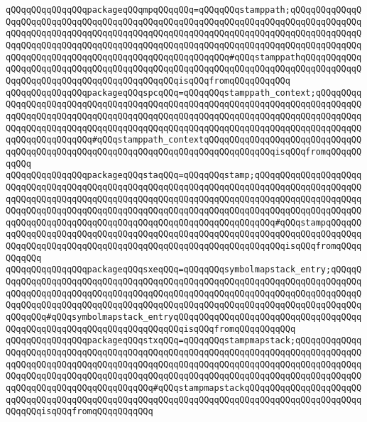 \verb|qQQqqQQqqQQqqQQqpackageqQQqmpqQQqqQQq=qQQqqQQqstamppath;qQQqqQQqqQQqqQQqqQQqqQQqqQQqqQQqqQQqqQQqqQQqqQQqqQQqqQQqqQQqqQQqqQQqqQQqqQQqqQQqqQQqqQQqqQQqqQQqqQQqqQQqqQQqqQQqqQQqqQQqqQQqqQQqqQQqqQQqqQQqqQQqqQQqqQQqqQQqqQQqqQQqqQQqqQQqqQQqqQQqqQQqqQQqqQQqqQQqqQQqqQQqqQQqqQQqqQQqqQQqqQQqqQQqqQQqqQQqqQQqqQQqqQQqqQQqqQQqqQQqqQQqqQQq#qQQqstamppathqQQqqQQqqQQqqQQqqQQqqQQqqQQqqQQqqQQqqQQqqQQqqQQqqQQqqQQqqQQqqQQqqQQqqQQqqQQqqQQqqQQqqQQqqQQqqQQqqQQqqQQqqQQqqQQqqQQqisqQQqfromqQQqqQQqqQQq|\newline
\verb|qQQqqQQqqQQqqQQqpackageqQQqspcqQQq=qQQqqQQqstamppath_context;qQQqqQQqqQQqqQQqqQQqqQQqqQQqqQQqqQQqqQQqqQQqqQQqqQQqqQQqqQQqqQQqqQQqqQQqqQQqqQQqqQQqqQQqqQQqqQQqqQQqqQQqqQQqqQQqqQQqqQQqqQQqqQQqqQQqqQQqqQQqqQQqqQQqqQQqqQQqqQQqqQQqqQQqqQQqqQQqqQQqqQQqqQQqqQQqqQQqqQQqqQQqqQQqqQQqqQQqqQQqqQQqqQQqqQQqqQQq#qQQqstamppath_contextqQQqqQQqqQQqqQQqqQQqqQQqqQQqqQQqqQQqqQQqqQQqqQQqqQQqqQQqqQQqqQQqqQQqqQQqqQQqqQQqqQQqisqQQqfromqQQqqQQqqQQq|\newline
\verb|qQQqqQQqqQQqqQQqpackageqQQqstaqQQq=qQQqqQQqstamp;qQQqqQQqqQQqqQQqqQQqqQQqqQQqqQQqqQQqqQQqqQQqqQQqqQQqqQQqqQQqqQQqqQQqqQQqqQQqqQQqqQQqqQQqqQQqqQQqqQQqqQQqqQQqqQQqqQQqqQQqqQQqqQQqqQQqqQQqqQQqqQQqqQQqqQQqqQQqqQQqqQQqqQQqqQQqqQQqqQQqqQQqqQQqqQQqqQQqqQQqqQQqqQQqqQQqqQQqqQQqqQQqqQQqqQQqqQQqqQQqqQQqqQQqqQQqqQQqqQQqqQQqqQQqqQQqqQQqqQQqqQQq#qQQqstampqQQqqQQqqQQqqQQqqQQqqQQqqQQqqQQqqQQqqQQqqQQqqQQqqQQqqQQqqQQqqQQqqQQqqQQqqQQqqQQqqQQqqQQqqQQqqQQqqQQqqQQqqQQqqQQqqQQqqQQqqQQqqQQqqQQqisqQQqfromqQQqqQQqqQQq|\newline
\verb|qQQqqQQqqQQqqQQqpackageqQQqsxeqQQq=qQQqqQQqsymbolmapstack_entry;qQQqqQQqqQQqqQQqqQQqqQQqqQQqqQQqqQQqqQQqqQQqqQQqqQQqqQQqqQQqqQQqqQQqqQQqqQQqqQQqqQQqqQQqqQQqqQQqqQQqqQQqqQQqqQQqqQQqqQQqqQQqqQQqqQQqqQQqqQQqqQQqqQQqqQQqqQQqqQQqqQQqqQQqqQQqqQQqqQQqqQQqqQQqqQQqqQQqqQQqqQQqqQQqqQQqqQQqqQQqqQQq#qQQqsymbolmapstack_entryqQQqqQQqqQQqqQQqqQQqqQQqqQQqqQQqqQQqqQQqqQQqqQQqqQQqqQQqqQQqqQQqqQQqqQQqisqQQqfromqQQqqQQqqQQq|\newline
\verb|qQQqqQQqqQQqqQQqpackageqQQqstxqQQq=qQQqqQQqstampmapstack;qQQqqQQqqQQqqQQqqQQqqQQqqQQqqQQqqQQqqQQqqQQqqQQqqQQqqQQqqQQqqQQqqQQqqQQqqQQqqQQqqQQqqQQqqQQqqQQqqQQqqQQqqQQqqQQqqQQqqQQqqQQqqQQqqQQqqQQqqQQqqQQqqQQqqQQqqQQqqQQqqQQqqQQqqQQqqQQqqQQqqQQqqQQqqQQqqQQqqQQqqQQqqQQqqQQqqQQqqQQqqQQqqQQqqQQqqQQqqQQqqQQqqQQqqQQq#qQQqstampmapstackqQQqqQQqqQQqqQQqqQQqqQQqqQQqqQQqqQQqqQQqqQQqqQQqqQQqqQQqqQQqqQQqqQQqqQQqqQQqqQQqqQQqqQQqqQQqqQQqqQQqisqQQqfromqQQqqQQqqQQq|\newline
